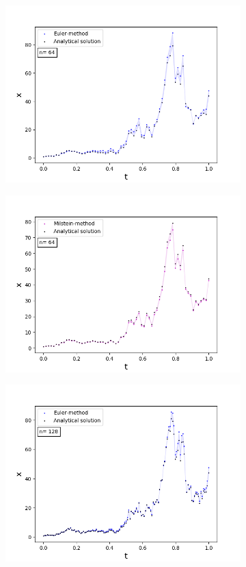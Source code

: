 \begin{figure}[!h]
\begin{subfigure}{0.49\linewidth}
     \includegraphics[scale=0.4]{Content/Graphics/Appendix/3gbm}
   \end{subfigure}
   \begin{subfigure}{0.49\linewidth} \centering
     \includegraphics[scale=0.4]{Content/Graphics/Appendix/4gbm}
   \end{subfigure}
   \begin{subfigure}{0.49\linewidth} \centering
     \includegraphics[scale=0.4]{Content/Graphics/Appendix/5gbm}

\end{subfigure}
\end{figure}
